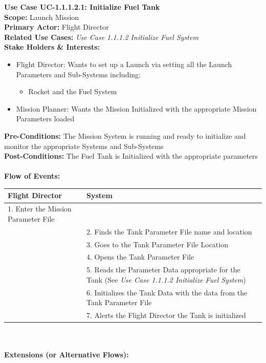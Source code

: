 \documentclass[letterpaper]{article}
\begin{document}
\noindent
\textbf{Use Case UC-1.1.1.2.1:  Initialize Fuel Tank}\\
\textbf{Scope:}  Launch Mission\\
\textbf{Primary Actor:} Flight Director\\
\textbf{Related Use Cases:} 
\textit{Use Case 1.1.1.2 Initialize Fuel System}\\
\textbf{Stake Holders  \& Interests:}
\begin{itemize}
   \item Flight Director:  Wants to set up a Launch via setting all
      the Launch Parameters and Sub-Systems including:
      \begin{itemize}
         \item Rocket and the Fuel System
      \end{itemize}
   \item Mission Planner:  Wants the Mission Initialized with the
      appropriate Mission Parameters loaded
\end{itemize}
\textbf{Pre-Conditions:  }The Mission System is running and ready to
initialize and monitor the appropriate Systems and Sub-Systems\\
\textbf{Post-Conditions:  }The Fuel Tank is Initialized with the
appropriate parameters\\\\
\textbf{Flow of Events:}\\
\begin{tabular}{|p{5.75cm}|p{5.75cm}|}\hline
   \textbf{Flight Director}&\textbf{System}\\\hline
   1.  Enter the Mission Parameter File &\\\hline
   &2.  Finds the Tank Parameter File name and location\\\hline
   &3.  Goes to the Tank Parameter File Location\\\hline
   &4.  Opens the Tank Parameter File\\\hline
   &5.  Reads the Parameter Data appropriate for the Tank (See 
   \textit{Use Case 1.1.1.2 Initialize Fuel System})\\\hline
   &6.  Initializes the Tank Data with the data from the Tank 
   Parameter File\\\hline
   &7.   Alerts the Flight Director the Tank is initialized\\\hline
\end{tabular}\\\\
\textbf{Extensions (or Alternative Flows):}
\end{document}

